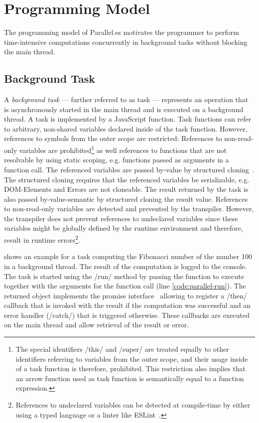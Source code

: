 \section{Programming Model}\label{sec:programming-model}
The programming model of Parallel.es motivates the programmer to perform time-intensive computations concurrently in background tasks without blocking the main thread. 

\subsection{Background Task}
A \textit{background task} --- further referred to as task --- represents an operation that is asynchronously started in the main thread and is executed on a background thread. A task is implemented by a JavaScript function. Task functions can refer to arbitrary, non-shared variables declared inside of the task function. However, references to symbols from the outer scope are restricted: References to non-read-only variables are prohibited\footnote{The special identifiers \javascriptinline/this/ and \javascriptinline/super/ are treated equally to other identifiers referring to variables from the outer scope, and their usage inside of a task function is therefore, prohibited. This restriction also implies that an arrow function used as task function is semantically equal to a function expression.} as well references to functions that are not resolvable by using static scoping, e.g. functions passed as arguments in a function call. The referenced variables are passed by-value by structured cloning~\cite[Section 2.9.4]{WHATWG2016}. The structured cloning requires that the referenced variables be serializable, e.g. DOM-Elements and Errors are not cloneable. The result returned by the task is also passed by-value-semantic by structured cloning the result value. References to non-read-only variables are detected and prevented by the transpiler. However, the transpiler does not prevent references to undeclared variables since these variables might be globally defined by the runtime environment and therefore, result in runtime errors\footnote{References to undeclared variables can be detected at compile-time by either using a typed language or a linter like ESLint~\cite{eslint}.}.

 shows an example for a task computing the Fibonacci number of the number 100 in a background thread. The result of the computation is logged to the console. The task is started using the \javascriptinline/run/ method by passing the function to execute together with the arguments for the function call (line \ref{code:parallel-run}). The returned object implements the promise interface~\cite[Section 18.3.18]{ecmaScript2015} allowing to register a \javascriptinline/then/ callback that is invoked with the result if the computation was successful and an error handler (\javascriptinline/catch/) that is triggered otherwise. These callbacks are executed on the main thread and allow retrieval of the result or error. 


